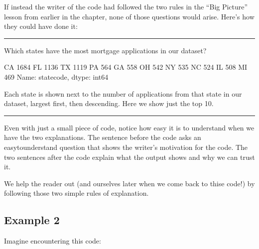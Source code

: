\documentclass[letterpaper,10pt,english]{sphinxmanual}
\begin{document}
If instead the writer of the code had followed the two rules in the “Big Picture” lesson from earlier in the chapter, none of those questions would arise.  Here’s how they could have done it:


\bigskip\hrule\bigskip


Which states have the most mortgage applications in our dataset?

\begin{sphinxVerbatim}[commandchars=\\\{\}]
\PYG{p}{[}\PYG{p}{]}  
\end{sphinxVerbatim}

\begin{sphinxVerbatim}[commandchars=\\\{\}]
CA    1684
FL    1136
TX    1119
PA     564
GA     558
OH     542
NY     535
NC     524
IL     508
MI     469
Name: state\PYGZus{}code, dtype: int64
\end{sphinxVerbatim}

Each state is shown next to the number of applications from that state in our dataset, largest first, then descending.  Here we show just the top 10.


\bigskip\hrule\bigskip


Even with just a small piece of code, notice how easy it is to understand when we have the two explanations.  The sentence before the code asks an easy\sphinxhyphen{}to\sphinxhyphen{}understand question that shows the writer’s motivation for the code.  The two sentences after the code explain what the output shows and why we can trust it.

We help the reader out (and ourselves later when we come back to thise code!) by following those two simple rules of explanation.


\subsection{Example 2}
\label{\detokenize{chapter-5-before-and-after:example-2}}
Imagine encountering this code:

\begin{sphinxVerbatim}[commandchars=\\\{\}]
  \PYG{p}{[}\PYG{p}{]}
\end{sphinxVerbatim}
\end{document}
